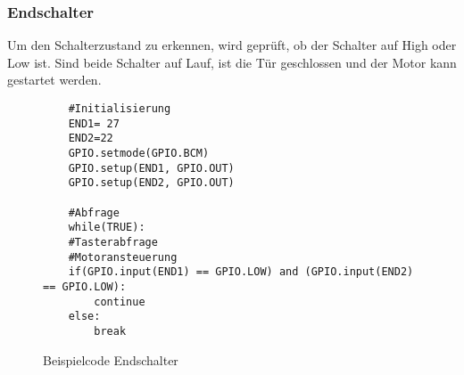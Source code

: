 \subsubsection{Endschalter}\label{sec:test end}
Um den Schalterzustand zu erkennen, wird geprüft, ob der Schalter auf High oder Low ist. Sind beide Schalter auf Lauf, ist die Tür geschlossen und der Motor kann gestartet werden. \\
\vspace{3mm}
\begin{figure}[H]
    \centering
    \begin{verbatim}
    #Initialisierung
    END1= 27
    END2=22
    GPIO.setmode(GPIO.BCM)
    GPIO.setup(END1, GPIO.OUT)
    GPIO.setup(END2, GPIO.OUT)

    #Abfrage
    while(TRUE):
    #Tasterabfrage
    #Motoransteuerung
    if(GPIO.input(END1) == GPIO.LOW) and (GPIO.input(END2) == GPIO.LOW):
        continue
    else:
        break

    \end{verbatim}
    \caption{Beispielcode Endschalter}
\end{figure}

\SecAuth{\nameSB}
